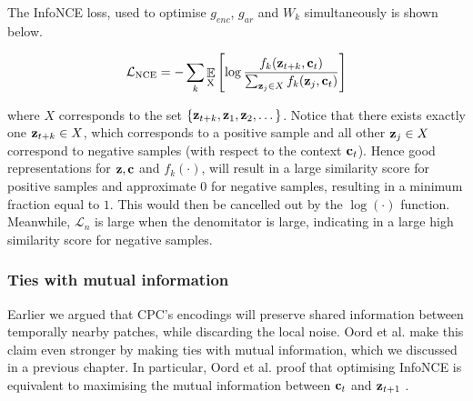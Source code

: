 
	
	The InfoNCE loss, used to optimise $g_{enc}$, $g_{ar}$ and $W_k$ simultaneously is shown below. 

	\begin{equation} %
		\Lnce = - \sum_{k} \expected{\textsubscript{X}} \left[ \log \nceprediction \right] \label{eq:NCE_loss}
	\end{equation}
	
	where $X$ corresponds to the set ${ \left\{ \mathbf{z}_{t+k}, \mathbf{z}_1, \mathbf{z}_2, \dots \right\} }$. Notice that there exists exactly one $\mathbf{z}_{t+k} \in X$, which corresponds to a positive sample and all other $\mathbf{z}_j \in X$ correspond to negative samples (with respect to the context $\mathbf{c}_t$).  Hence good representations for $\mathbf{z}, \mathbf{c}$ and $f_k(\cdot)$, will result in a large similarity score for positive samples and approximate $0$ for negative samples, resulting in a minimum fraction equal to $1$. This would then be cancelled out by the $\log(\cdot)$ function. Meanwhile, $\mathcal{L}_n$ is large when the denomitator is large, indicating in a large high similarity score for negative samples.
	
\subsubsection{Ties with mutual information}
	Earlier we argued that CPC's encodings will preserve shared information between temporally nearby patches, while discarding the local noise. Oord et al. make this claim even stronger by making ties with mutual information, which we discussed in a previous chapter. In particular, Oord et al. proof that optimising InfoNCE is equivalent to maximising the mutual information between $\mathbf{c}_t$ and $\mathbf{z}_{t+1}$ \cite{oordRepresentationLearningContrastive2019}. 
	
